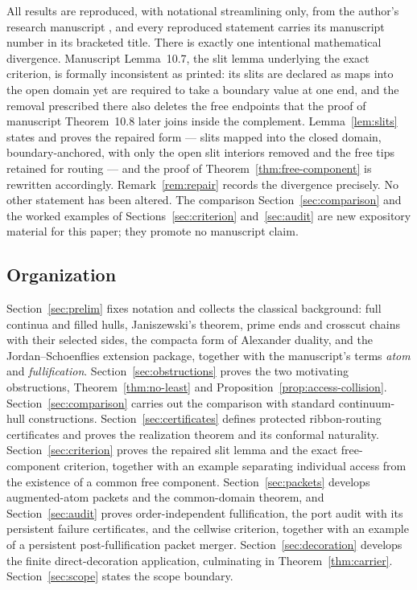 All results are reproduced, with notational streamlining only, from the
author's research manuscript \cite{MWman}, and every reproduced statement
carries its manuscript number in its bracketed title.  There is exactly one
intentional mathematical divergence.  Manuscript Lemma~10.7, the slit lemma
underlying the exact criterion, is formally inconsistent as printed: its
slits are declared as maps into the open domain yet are required to take a
boundary value at one end, and the removal prescribed there also deletes the
free endpoints that the proof of manuscript Theorem~10.8 later joins inside
the complement.  Lemma~\ref{lem:slits} states and proves the repaired
form --- slits mapped into the closed domain, boundary-anchored, with only
the open slit interiors removed and the free tips retained for routing ---
and the proof of Theorem~\ref{thm:free-component} is rewritten accordingly.
Remark~\ref{rem:repair} records the divergence precisely.  No other
statement has been altered.  The comparison Section~\ref{sec:comparison} and
the worked examples of Sections~\ref{sec:criterion} and~\ref{sec:audit} are
new expository material for this paper; they promote no manuscript claim.

\subsection{Organization}\label{subsec:A-roadmap}

Section~\ref{sec:prelim} fixes notation and collects the classical
background: full continua and filled hulls, Janiszewski's theorem, prime
ends and crosscut chains with their selected sides, the compacta form of
Alexander duality, and the Jordan--Schoenflies extension package, together
with the manuscript's terms \emph{atom} and \emph{fullification}.
Section~\ref{sec:obstructions} proves the two motivating obstructions,
Theorem~\ref{thm:no-least} and Proposition~\ref{prop:access-collision}.
Section~\ref{sec:comparison} carries out the comparison with standard
continuum-hull constructions.  Section~\ref{sec:certificates} defines
protected ribbon-routing certificates and proves the realization theorem and
its conformal naturality.  Section~\ref{sec:criterion} proves the repaired
slit lemma and the exact free-component criterion, together with an example
separating individual access from the existence of a common free component.
Section~\ref{sec:packets} develops augmented-atom packets and the
common-domain theorem, and Section~\ref{sec:audit} proves order-independent
fullification, the port audit with its persistent failure certificates, and
the cellwise criterion, together with an example of a persistent
post-fullification packet merger.  Section~\ref{sec:decoration} develops the
finite direct-decoration application, culminating in
Theorem~\ref{thm:carrier}.  Section~\ref{sec:scope} states the scope
boundary.

